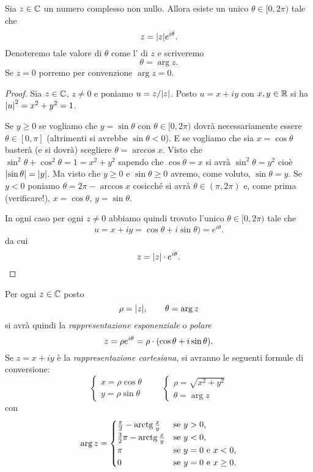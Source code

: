 \begin{theorem}[argomento]
Sia $z\in \mathbb C$ un numero complesso non nullo. Allora esiste un
unico $\theta\in [0,2\pi)$ tale che
\[
z = {\left|z\right|} e^{i\theta}.
\]
Denoteremo tale valore di $\theta$ come l' di $z$
e scriveremo
\[
  \theta = \arg z.
\]
Se $z=0$ porremo per convenzione $\arg z=0$.
\end{theorem}
%
\begin{proof}
Sia $z\in \mathbb C$, $z\neq 0$ e poniamo $u = z/{\left|z\right|}$.
Posto $u=x+iy$ con $x,y\in \mathbb R$ si ha ${\left|u\right|}^2 = x^2+y^2=1$.

Se $y\ge 0$ se vogliamo che $y=\sin \theta$ con $\theta\in [0,2\pi)$
dovrà necessariamente essere $\theta \in [0,\pi]$
(altrimenti si avrebbe $\sin \theta<0$).
E se vogliamo che sia $x=\cos \theta$ basterà (e si dovrà) scegliere
$\theta = \arccos x$.
Visto che $\sin^2 \theta + \cos^2\theta = 1 = x^2 + y^2$
sapendo che $\cos \theta = x$
si avrà
$\sin^2 \theta = y^2$ cioè ${\left|\sin \theta\right|}={\left|y\right|}$.
Ma visto che $y\ge 0$ e $\sin \theta\ge 0$
avremo, come voluto, $\sin \theta = y$.
Se $y<0$ poniamo $\theta = 2\pi - \arccos x$
cosicché si avrà $\theta \in (\pi, 2\pi)$
e, come prima (verificare!),
$x=\cos \theta$, $y=\sin \theta$.

In ogni caso per ogni $z\neq 0$ abbiamo quindi trovato l'unico
$\theta\in [0,2\pi)$ tale che
\[
  u
  = x + i y
  = \cos \theta + i\sin \theta)
  = e^{i\theta}.
\]
da cui
\[
  z = {\left|z\right|}\cdot e^{i\theta}.
\]
\end{proof}

Per ogni $z\in \mathbb C$ posto
\[
  \rho = {\left|z\right|}, \qquad \theta = \arg z
\]
si avrà quindi la \emph{rappresentazione esponenziale} o \emph{polare}
\[
  z = \rho e^{i\theta} = \rho \cdot {\left( \cos \theta
  + i \sin \theta \right)}.
\]
Se $z=x+iy$ è la \emph{rappresentazione cartesiana}, si avranno
le seguenti formule di conversione:
\[
\begin{cases}
  x = \rho \cos \theta\\
  y = \rho \sin \theta
\end{cases}
\qquad
\begin{cases}
 \rho = \sqrt{x^2+y^2}\\
 \theta = \arg z
\end{cases}
\]
con
\[
  \arg z =
  \begin{cases}
   \frac \pi 2 - \operatorname{arctg} \frac x y & \text{se $y>0$,} \\
   \frac 3 2 \pi- \operatorname{arctg} \frac x y & \text{se $y<0$,} \\
   \pi & \text{se $y=0$ e $x<0$,} \\
   0 & \text{se $y=0$ e $x\ge 0$.}
   \end{cases}
\]

